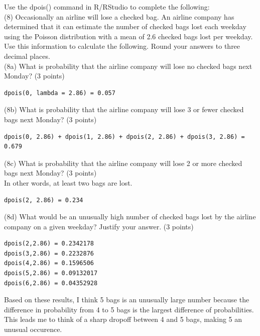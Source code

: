 \documentclass{article}
\begin{document}
Use the dpois() command in R/RStudio to complete the following:\\

(8) Occasionally an airline will lose a checked bag. An airline company has determined that it can estimate the number of checked bags lost each weekday using the Poisson distribution with a mean of 2.6 checked bags lost per weekday. Use this information to calculate the following. Round your answers to three decimal places.\\


(8a) What is probability that the airline company will lose no checked bags next Monday? (3 points)
\begin{center}
\begin{lstlisting}
dpois(0, lambda = 2.86) = 0.057
\end{lstlisting}
\end{center}

(8b) What is probability that the airline company will lose 3 or fewer checked bags next Monday? (3 points)
\begin{center}
\begin{lstlisting}
dpois(0, 2.86) + dpois(1, 2.86) + dpois(2, 2.86) + dpois(3, 2.86) = 0.679
\end{lstlisting}
\end{center}
(8c) What is probability that the airline company will lose 2 or more checked bags next Monday? (3 points)\\

In other words, at least two bags are lost.
\begin{center}
\begin{lstlisting}
dpois(2, 2.86) = 0.234
\end{lstlisting}
\end{center}
(8d) What would be an unusually high number of checked bags lost by the airline company on a given weekday? Justify your answer. (3 points)
\begin{center}
\begin{lstlisting}
dpois(2,2.86) = 0.2342178
dpois(3,2.86) = 0.2232876
dpois(4,2.86) = 0.1596506
dpois(5,2.86) = 0.09132017
dpois(6,2.86) = 0.04352928
\end{lstlisting}
\end{center}
Based on these results, I think 5 bags is an unusually large number because the difference in probability from 4 to 5 bags is the largest difference of probabilities. This leads me to think of a sharp dropoff between 4 and 5 bags, making 5 an unusual occurence.
\end{document}
